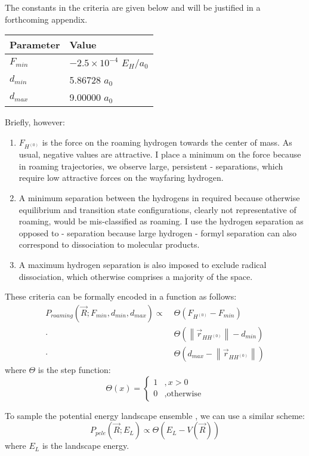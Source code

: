 \documentclass[letterpaper,12pt]{article}
\newcommand{\norm}[1]{\left\lVert#1\right\rVert}
\begin{document}
The constants in the criteria are given below and will be justified in a forthcoming appendix.
\begin{center}
\begin{tabular}{l l}
Parameter & Value \\
\hline
 $F_{min}$ & $-2.5\times 10^{-4}$ $E_H/a_0$ \\
$d_{min}$ & 5.86728 $a_0$ \\
$d_{max}$ & 9.00000 $a_0$ 
\end{tabular}
\end{center}
Briefly, however:
\begin{enumerate}
\item $F_{H^{(0)}}$ is the force on the roaming hydrogen towards the center of mass. As usual, negative values are attractive. I place a minimum on the force because in roaming trajectories, we observe large, persistent  -  separations, which require low attractive forces on the wayfaring hydrogen.
\item A minimum separation between the hydrogens in required because otherwise equilibrium and transition state configurations, clearly not representative of roaming, would be mis-classified as roaming. I use the hydrogen separation as opposed to  -  separation because large hydrogen - formyl separation can also correspond to dissociation to molecular products.
\item A maximum hydrogen separation is also imposed to exclude radical dissociation, which otherwise comprises a majority of the space.
\end{enumerate}

These criteria can be formally encoded in a function as follows:
\begin{align}\label{eqn:p-roaming}
P_{roaming}(\vec{R}; F_{min}, d_{min}, d_{max}) \propto \;
&\Theta \left( F_{H^{(0)}} - F_{min} \right) \\
\cdot &\Theta \left( \norm{\vec{r}_{HH^{(0)}}} - d_{min} \right) \\
\cdot &\Theta \left(d_{max} - \norm{\vec{r}_{HH^{(0)}}} \right)
\end{align}
where $\Theta$ is the step function:
\begin{equation}
\Theta(x) =
\begin{cases}
1 &, x>0 \\
0 &, \text{otherwise}
\end{cases}
\end{equation}

To sample the potential energy landscape ensemble \cite{wang:2007:pele}, we can use a similar scheme:
\begin{equation}\label{eqn:p-pele}
P_{pele}(\vec{R}; E_L) \propto \Theta \left( E_L - V(\vec{R}) \right)
\end{equation}
where $E_L$ is the landscape energy.
\end{document}
